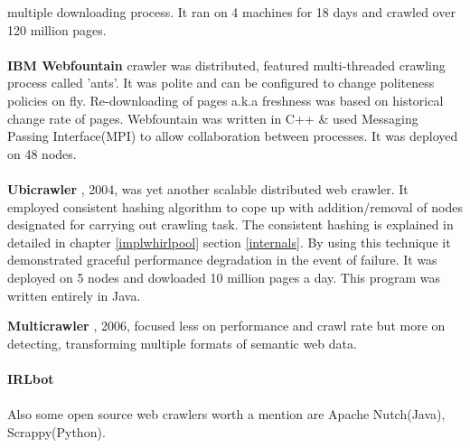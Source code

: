 multiple downloading process. It ran on 4 machines for 18 days and crawled over 120 million pages.
\\
\\
\textbf{IBM Webfountain} crawler was distributed, featured multi-threaded crawling process called 'ants'.
It was polite and can be configured to change politeness policies on fly. Re-downloading of pages a.k.a
freshness was based on historical change rate of pages. Webfountain was written in C++ \& used Messaging
Passing Interface(MPI) to allow collaboration between processes. It was deployed on 48 nodes.
\\
\\
\textbf{Ubicrawler} \cite{ubicrawler}, 2004, was yet another scalable distributed web crawler. It employed
consistent hashing algorithm to cope up with addition/removal of nodes designated for carrying out crawling
task. The consistent hashing is explained in detailed in chapter \ref{implwhirlpool} section \ref{internals}. By using this technique it demonstrated graceful performance degradation in the event of failure. It was
deployed on 5 nodes and dowloaded 10 million pages a day. This program was written entirely in Java.
\\
\pagebreak

\textbf{Multicrawler} \cite{multicrawler} , 2006, focused less on performance and crawl rate but more on
detecting, transforming multiple formats of semantic web data.
\\
\\
\textbf{IRLbot} \cite{irlbot}
\\
\\
Also some open source web crawlers worth a mention are Apache Nutch(Java), Scrappy(Python).
